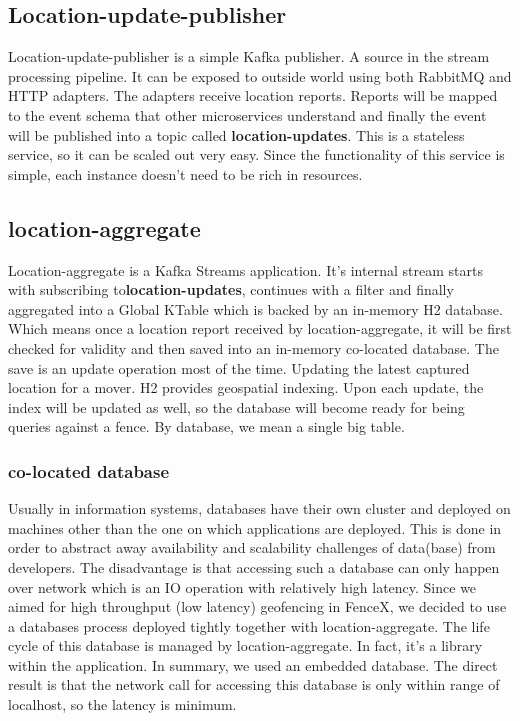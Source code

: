 \documentclass[a4]{report}
\begin{document}
    \subsection{Location-update-publisher}
    Location-update-publisher is a simple Kafka publisher.
    A source in the stream processing pipeline.
    It can be exposed to outside world using both RabbitMQ and HTTP adapters.
    The adapters receive location reports.
    Reports will be mapped to the event schema that other microservices
    understand and finally the event will be published into a topic called \textbf{location-updates}.
    This is a stateless service, so it can be scaled out very easy.
    Since the functionality of this service is simple, each instance doesn't need to be rich in resources.

    \subsection{location-aggregate}
    Location-aggregate is a Kafka Streams application.
    It's internal stream starts with subscribing to\textbf{location-updates}, continues with a filter and finally
    aggregated into a Global KTable which is backed by an in-memory H2 database.
    Which means once a location report received by location-aggregate, it will be first checked for validity and then
    saved into an in-memory co-located database.
    The save is an update operation most of the time.
    Updating the latest captured location for a mover.
    H2 provides geospatial indexing.
    Upon each update, the index will be updated as well, so the database will become ready for being queries against a
    fence.
    By database, we mean a single big table.

    \subsubsection{co-located database}
    Usually in information systems, databases have their own cluster and deployed on machines other than the one on
    which applications are deployed.
    This is done in order to abstract away availability and scalability challenges of data(base) from developers.
    The disadvantage is that accessing such a database can only happen over network which is an IO operation with
    relatively high latency.
    Since we aimed for high throughput (low latency) geofencing in FenceX, we decided to use a databases process
    deployed tightly together with location-aggregate.
    The life cycle of this database is managed by location-aggregate.
    In fact, it's a library within the application.
    In summary, we used an embedded database.
    The direct result is that the network call for accessing this database is only within range of localhost, so the
    latency is minimum.
\end{document}

